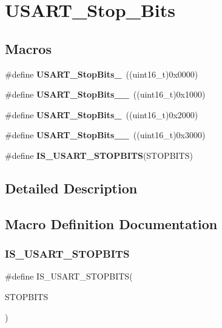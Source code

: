\section{U\+S\+A\+R\+T\+\_\+\+Stop\+\_\+\+Bits}
\label{group__USART__Stop__Bits}
\subsection*{Macros}
\begin{DoxyCompactItemize}
\item 
\#define \textbf{ U\+S\+A\+R\+T\+\_\+\+Stop\+Bits\+\_}~((uint16\+\_\+t)0x0000)
\item 
\#define \textbf{ U\+S\+A\+R\+T\+\_\+\+Stop\+Bits\+\_\+\_}~((uint16\+\_\+t)0x1000)
\item 
\#define \textbf{ U\+S\+A\+R\+T\+\_\+\+Stop\+Bits\+\_}~((uint16\+\_\+t)0x2000)
\item 
\#define \textbf{ U\+S\+A\+R\+T\+\_\+\+Stop\+Bits\+\_\+\_}~((uint16\+\_\+t)0x3000)
\item 
\#define \textbf{ I\+S\+\_\+\+U\+S\+A\+R\+T\+\_\+\+S\+T\+O\+P\+B\+I\+TS}(S\+T\+O\+P\+B\+I\+TS)
\end{DoxyCompactItemize}


\subsection{Detailed Description}


\subsection{Macro Definition Documentation}
\mbox{\label{group__USART__Stop__Bits_ga6f9153c1fbee1058ba26ec88f0f20828}} 
\subsubsection{I\+S\+\_\+\+U\+S\+A\+R\+T\+\_\+\+S\+T\+O\+P\+B\+I\+TS}
{\footnotesize\ttfamily \#define I\+S\+\_\+\+U\+S\+A\+R\+T\+\_\+\+S\+T\+O\+P\+B\+I\+TS(\begin{DoxyParamCaption}\item[{}]{S\+T\+O\+P\+B\+I\+TS }\end{DoxyParamCaption})}

